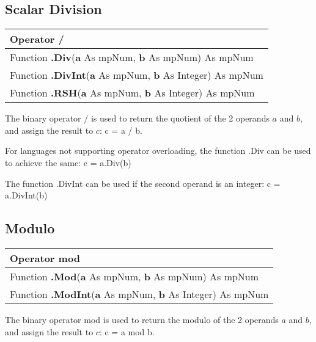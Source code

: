 \subsection{Scalar Division }
\begin{tabular}{p{481pt}}
	\toprule
	\textsf{Operator \textbf{/}}\index{Multiprecision Functions!/} \\
	\midrule
	\textsf{Function \textbf{.Div}(\textbf{a} As mpNum, \textbf{b} As mpNum) As mpNum}\index{Multiprecision Functions!.Div} \\
	\textsf{Function \textbf{.DivInt}(\textbf{a} As mpNum, \textbf{b} As Integer) As mpNum}\index{Multiprecision Functions!.DivInt} \\
	\textsf{Function \textbf{.RSH}(\textbf{a} As mpNum, \textbf{b} As Integer) As mpNum}\index{Multiprecision Functions!.RSH} \\
	\bottomrule
\end{tabular}

\vspace{0.3cm}
The binary operator $/$ is used to return the quotient of the 2 operands $a$ and $b$, and assign the result to $c$: \textsf{c = a / b}.

For languages not supporting operator overloading, the function \textsf{.Div} can be used to achieve the same: \textsf{c = a.Div(b)}

The function \textsf{.DivInt}  can be used if the second operand is an integer: \textsf{c = a.DivInt(b)}





\subsection{Modulo }
\begin{tabular}{p{481pt}}
	\toprule
	\textsf{Operator \textbf{mod}}\index{Multiprecision Functions!mod} \\
	\midrule
	\textsf{Function \textbf{.Mod}(\textbf{a} As mpNum, \textbf{b} As mpNum) As mpNum}\index{Multiprecision Functions!.Mod} \\
	\textsf{Function \textbf{.ModInt}(\textbf{a} As mpNum, \textbf{b} As Integer) As mpNum}\index{Multiprecision Functions!.ModInt} \\
	\bottomrule
\end{tabular}

\vspace{0.3cm}
The binary operator \textsf{mod} is used to return the modulo of the 2 operands $a$ and $b$, and assign the result to $c$: \textsf{c = a mod b}.

